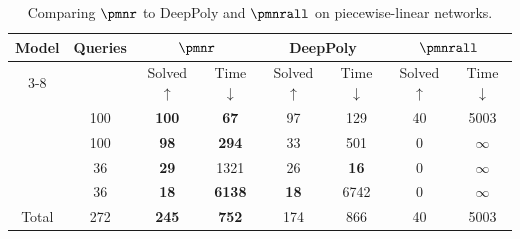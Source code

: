 \begin{table}[htb]
    \centering
	\caption{Comparing \(\pmnr\) to DeepPoly and \(\pmnrall\) on piecewise-linear networks.}
	\begin{tabular}{|c|c|cc|cc|cc|}
		\hline
		\multirow{2}{*}{Model}         & \multirow{2}{*}{Queries}      &
		\multicolumn{2}{c|}{\(\pmnr\)} & \multicolumn{2}{c|}{DeepPoly} & \multicolumn{2}{c|}{\(\pmnrall\)}                                                                                                                                                                \\ \cline{3-8}
		                               &                               & \multicolumn{1}{c|}{Solved \(\uparrow\)} & Time \(\downarrow\) & \multicolumn{1}{c|}{Solved \(\uparrow\)} & Time \(\downarrow\) & \multicolumn{1}{c|}{Solved \(\uparrow\)} & Time \(\downarrow\) \\ \hline
		\LeakyReluFive                 & 100                           & \multicolumn{1}{c|}{\textbf{100}}        & \textbf{67}         & \multicolumn{1}{c|}{97}                  & 129                 & \multicolumn{1}{c|}{40}                  & 5003                \\ \hline
		\LeakyReluEight                & 100                           & \multicolumn{1}{c|}{\textbf{98}}         & \textbf{294}        & \multicolumn{1}{c|}{33}                  & 501                 & \multicolumn{1}{c|}{0}                   & \(\infty\)          \\ \hline
		\LeakyReluFourteen             & 36                            & \multicolumn{1}{c|}{\textbf{29}}         & 1321                & \multicolumn{1}{c|}{26}                  & \textbf{16}         & \multicolumn{1}{c|}{0}                   & \(\infty\)          \\ \hline
		\ReluSignMax                   & 36                            & \multicolumn{1}{c|}{\textbf{18}}         & \textbf{6138}       & \multicolumn{1}{c|}{\textbf{18}}         & 6742                & \multicolumn{1}{c|}{0}                   & \(\infty\)          \\ \hline
		Total                          & 272                           & \multicolumn{1}{c|}{\textbf{245}}        & \textbf{752}        & \multicolumn{1}{c|}{174}                 & 866                 & \multicolumn{1}{c|}{40}                  & 5003                \\ \hline
	\end{tabular}
	\label{tab:results-piecewise-linear}
\end{table}